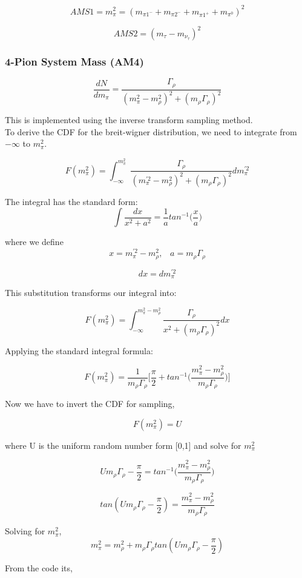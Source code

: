 \documentclass[12pt]{article}
\begin{document}
\[AMS1 = m_\pi^2 = (m_{\pi1^-} + m_{\pi2^-} + m_{\pi1^+} + m_{\pi^0})^2\]

\[AMS2 = (m_\tau - m_{\nu_\tau})^2\]


\subsubsection{4-Pion System Mass (AM4)}

\[\frac{dN}{dm_\pi} = \frac{\Gamma_\rho}{(m_\pi^2 - m_\rho^2)^2 + (m_\rho \Gamma_\rho)^2} \]


This is implemented using the inverse transform sampling method.\\

To derive the CDF for the breit-wigner distribution, we need to integrate from ${-\infty}$ to $m_\pi^2$. 

\[F(m_\pi^2) = \int_{-\infty}^{m_\pi^2}  \frac{\Gamma_\rho}{(m_\pi^{'2} - m_\rho^2)^2 + (m_\rho \Gamma_\rho)^2}dm_\pi^{'2} \]

The integral has the standard form:
\[\int \frac{dx}{x^2+a^2} = \frac{1}{a}tan^{-1}\Big(\frac{x}{a}\Big)\]

where we define 
\[x = m_\pi^{'2} - m_\rho^2,   \;\;\; a = m_\rho \Gamma_\rho \]

\[dx = dm_\pi^{'2}\]

This substitution transforms our integral into:

\[F(m_\pi^2) = \int_{-\infty}^{m_\pi^2-m_\rho^2}  \frac{\Gamma_\rho}{x^2 + (m_\rho \Gamma_\rho)^2}dx\]

Applying the standard integral formula:

\[F(m_\pi^2) = \frac{1}{m_\rho \Gamma_\rho} \Bigg[ \frac{\pi}{2} + tan^{-1}\Big( \frac{m_\pi^2-m_\rho^2}{m_\rho \Gamma_\rho}\Big) \Bigg]\]

Now we have to invert the CDF for sampling,

\[F(m_\pi^2) = U\]

where U is the uniform random number form [0,1] and solve for $m_\pi^2$

\[Um_\rho \Gamma_\rho - \frac{\pi}{2} = tan^{-1}\Bigg( \frac{m_\pi^2-m_\rho^2}{m_\rho \Gamma_\rho} \Bigg)\]

\[tan (Um_\rho \Gamma_\rho - \frac{\pi}{2}) = \frac{m_\pi^2-m_\rho^2}{m_\rho \Gamma_\rho}\]

Solving for $m_\pi^2$,
\[m_\pi^2 =  m_\rho^2 + m_\rho \Gamma_\rho tan(Um_\rho \Gamma_\rho - \frac{\pi}{2})\]


From the code its,
\end{document}
